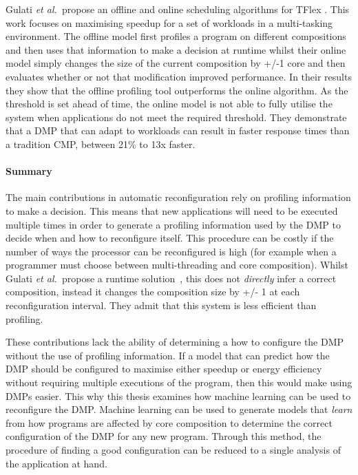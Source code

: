 Gulati {\it et al.~}propose an offline and online scheduling algorithms for TFlex \cite{gulati2008multitaskingdmc}. 
This work focuses on maximising speedup for a set of workloads in a multi-tasking environment.
The offline model first profiles a program on different compositions and then uses that information to make a decision at runtime whilst their online model simply changes the size of the current composition by +/-1 core and then evaluates whether or not that modification improved performance.
In their results they show that the offline profiling tool outperforms the online algorithm.
As the threshold is set ahead of time, the online model is not able to fully utilise the system when applications do not meet the required threshold.
They demonstrate that a DMP that can adapt to workloads can result in faster response times than a tradition CMP, between 21\% to 13x faster.

\paragraph*{Summary}
The main contributions in automatic reconfiguration rely on profiling information to make a decision.
This means that new applications will need to be executed multiple times in order to generate a profiling information used by the DMP to decide when and how to reconfigure itself.
This procedure can be costly if the number of ways the processor can be reconfigured is high (for example when a programmer must choose between multi-threading and core composition).
Whilst Gulati {\it et al.~}propose a runtime solution~\cite{gulati2008multitaskingdmc}, this does not \textit{directly} infer a correct composition, instead it changes the composition size by +/- 1 at each reconfiguration interval.
They admit that this system is less efficient than profiling.

These contributions lack the ability of determining a how to configure the DMP without the use of profiling information.
If a model that can predict how the DMP should be configured to maximise either speedup or energy efficiency without requiring multiple executions of the program, then this would make using DMPs easier.
This why this thesis examines how machine learning can be used to reconfigure the DMP.
Machine learning can be used to generate models that \textit{learn} from how programs are affected by core composition to determine the correct configuration of the DMP for any new program.
Through this method, the procedure of finding a good configuration can be reduced to a single analysis of the application at hand.

